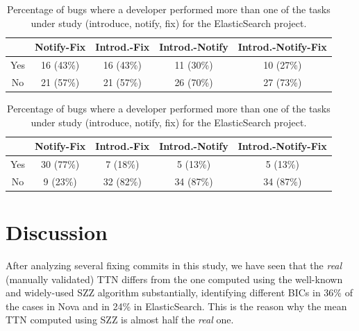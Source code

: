 \documentclass[10pt, conference]{IEEEtran}
\begin{document}
\begin{table}[!t]
\renewcommand{\arraystretch}{1.3}
\centering
\caption{Percentage of bugs where a developer performed more than one of the tasks under study (introduce, notify, fix) for the ElasticSearch project.}
\label{tableII}
\begin{tabular}{|c||c||c||c||c| }
\hline
  & Notify-Fix & Introd.-Fix & Introd.-Notify &  Introd.-Notify-Fix \\
\hline
Yes & 16 (43\%) & 16 (43\%) & 11 (30\%) & 10 (27\%) \\
\hline
No & 21 (57\%) & 21 (57\%) & 26 (70\%) & 27 (73\%) \\
\hline
\end{tabular}
\end{table}

\begin{table}[!t]
\renewcommand{\arraystretch}{1.3}
\centering
\caption{Percentage of bugs where a developer performed more than one of the tasks under study (introduce, notify, fix) for the ElasticSearch project.}
\label{tableIII}
\begin{tabular}{|c||c||c||c||c| }
\hline
  & Notify-Fix & Introd.-Fix & Introd.-Notify & Introd.-Notify-Fix \\
\hline
Yes & 30 (77\%) & 7 (18\%) & 5 (13\%) & 5 (13\%) \\
\hline
No & 9 (23\%) & 32 (82\%) & 34 (87\%) &  34 (87\%) \\
\hline
\end{tabular}
\end{table}


\section{Discussion}
\label{sec:discussion}
After analyzing several fixing commits in this study, we have seen that the \emph{real} (manually validated) TTN differs from the one computed using the well-known and widely-used SZZ algorithm substantially, identifying different BICs in 36\% of the cases in Nova and in 24\% in ElasticSearch. This is the reason why the mean TTN computed using SZZ is almost half the \emph{real} one. %
\end{document}
